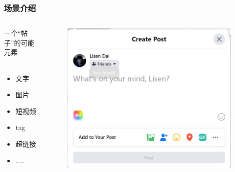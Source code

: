 \documentclass[10pt]{beamer}
\begin{document}
\begin{frame}
\begin{columns}
\begin{column}{.4\linewidth}
                \end{column}
            \end{columns}
        \end{frame}

        \begin{frame}
            \frametitle{场景介绍}
            \begin{columns}
                \begin{column}{.3\linewidth}
                    {\large 一个“帖子”的可能元素} \\
                    \hspace*{\fill} \\
                    \begin{itemize}
                        \item 文字
                        \item 图片
                        \item 短视频
                        \item tag
                        \item 超链接
                        \item ……
                    \end{itemize}

                \end{column}

                \begin{column}{.5\linewidth}
                    
                    \begin{figure}[h]
                        \centering
                        \includegraphics[scale=0.24]{src/img/Facebook.png} \\
                    \end{figure}


\end{column}
\end{columns}
\end{frame}
\end{document}
